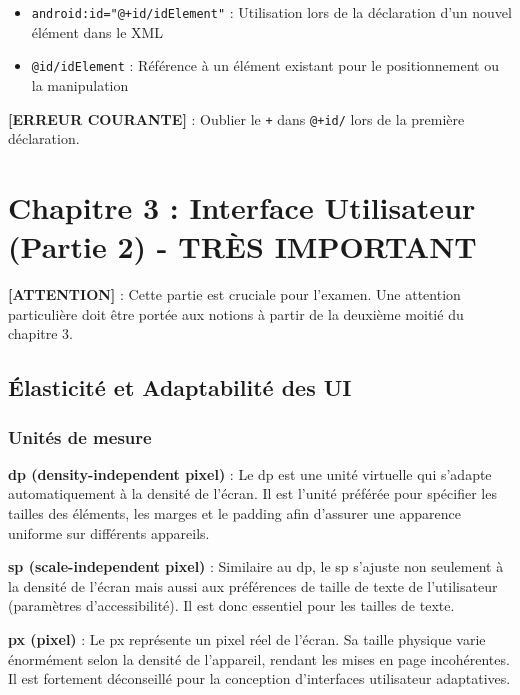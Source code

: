 \documentclass[11pt,a4paper]{article}
\begin{document}
\begin{itemize}
    \item \texttt{android:id="@+id/idElement"} : Utilisation lors de la déclaration d'un nouvel élément dans le XML
    \item \texttt{@id/idElement} : Référence à un élément existant pour le positionnement ou la manipulation
\end{itemize}

\textbf{[ERREUR COURANTE]} : Oublier le \texttt{+} dans \texttt{@+id/} lors de la première déclaration.


\section{Chapitre 3 : Interface Utilisateur (Partie 2) - \textcolor{red!80!black}{TRÈS IMPORTANT}}

\textbf{[ATTENTION]} : Cette partie est cruciale pour l'examen. Une attention particulière doit être portée aux notions à partir de la deuxième moitié du chapitre 3.

\subsection{Élasticité et Adaptabilité des UI}

\subsubsection{Unités de mesure}

\textbf{dp (density-independent pixel)} : Le dp est une unité virtuelle qui s'adapte automatiquement à la densité de l'écran. Il est l'unité préférée pour spécifier les tailles des éléments, les marges et le padding afin d'assurer une apparence uniforme sur différents appareils.

\textbf{sp (scale-independent pixel)} : Similaire au dp, le sp s'ajuste non seulement à la densité de l'écran mais aussi aux préférences de taille de texte de l'utilisateur (paramètres d'accessibilité). Il est donc essentiel pour les tailles de texte.

\textbf{px (pixel)} : Le px représente un pixel réel de l'écran. Sa taille physique varie énormément selon la densité de l'appareil, rendant les mises en page incohérentes. Il est fortement déconseillé pour la conception d'interfaces utilisateur adaptatives.
\end{document}
